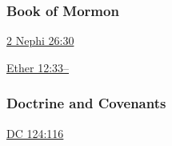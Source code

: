 				
				
		
	\subsubsection{Book of Mormon} %
		\label{CHARITY-BOM}
	
		
		\begin{compactdesc}
			\item[{\hyperref[2NEPHI-26-30]{2 Nephi 26:30}}]
			\item[{\hyperref[ETHER-12-33]{Ether 12:33--}}]
		\end{compactdesc}
		
	\subsubsection{Doctrine and Covenants} %
		\label{CHARITY-DC}
	
		
		\begin{compactdesc}
			\item[{\hyperref[DC124-116]{DC 124:116}}]
		\end{compactdesc}
		
	
